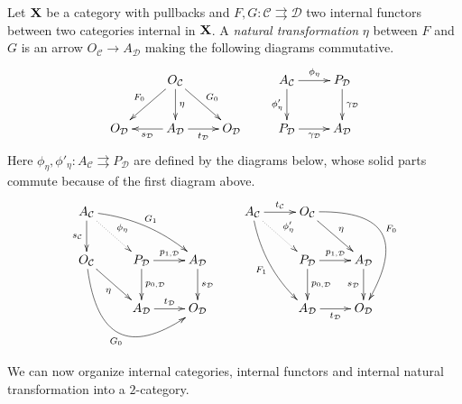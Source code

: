 \documentclass[a4paper,UKenglish,cleveref,pdftex,thm-restate,numberwithinsect]{lipics-v2021}
\def\X{\textbf {\textup{X}}}
\begin{document}
\begin{definition}
	Let $\X$ be a category with pullbacks and $F, G\colon \mathcal{C}\rightrightarrows \mathcal{D}$ two internal functors between two categories internal in $\X$. A \emph{natural transformation} $\eta$ between $F$ and $G$ is an arrow $O_\mathcal{C}\to A_{\mathcal{D}}$ making the following diagrams commutative.	
	\[\xymatrix{ & O_{\mathcal{C}} \ar[d]^{\eta} \ar[dr]^{G_0} \ar[dl]_{F_0}  && A_{\mathcal{C}} \ar[r]^{\phi_\eta} \ar[d]_{\phi'_\eta}& P_{\mathcal{D}} \ar[d]^{\gamma_{\mathcal{D}}}\\O_{\mathcal{D}} & A_{\mathcal{D}} \ar[r]_{t_{\mathcal{D}}} \ar[l]^{s_{\mathcal{D}}}& O_{\mathcal{D}} & P_{\mathcal{D}} \ar[r]_{\gamma_{\mathcal{D}}}& A_{\mathcal{D}} } \]
Here $\phi_\eta, \phi'_\eta \colon A_{\mathcal{C}}\rightrightarrows P_{\mathcal{D}}$ are defined by the diagrams below, whose solid parts commute because of the first diagram above.
\[\xymatrix{A_{\mathcal{C}} \ar@{.>}[dr]^{\phi_\eta} \ar[d]_{s_{\mathcal{C}}} \ar@/^.3cm/[drr]^{G_1}&&& A_{\mathcal{C}} \ar@{.>}[dr]^{\phi'_\eta} \ar[r]^{t_{\mathcal{C}}} \ar@/_.3cm/[ddr]_{F_1} & O_{\mathcal{C}} \ar[dr]^{\eta} \ar@/^1.5cm/[ddr]^{F_0}\\ O_{\mathcal{C}} \ar[dr]_{\eta}  \ar@/_1.5cm/[drr]_{G_0}& P_{\mathcal{D}} \ar[r]^{p_{1, \mathcal{D}}} \ar[d]^{p_{0, \mathcal{D}}} & A_{\mathcal{D}} \ar[d]^{s_{\mathcal{D}}} &  & P_{\mathcal{D}} \ar[r]^{p_{1, \mathcal{D}}} \ar[d]^{p_{0, \mathcal{D}}} & A_{\mathcal{D}} \ar[d]_{s_{\mathcal{D}}} \\ & A_{\mathcal{D}} \ar[r]^{t_{\mathcal{D}}}& O_{\mathcal{D}}  & & A_{\mathcal{D}} \ar[r]_{t_{\mathcal{D}}}& O_{\mathcal{D}} }\]
\end{definition}

We can  now organize internal categories, internal functors and internal natural transformation into a $2$-category.
\end{document}
